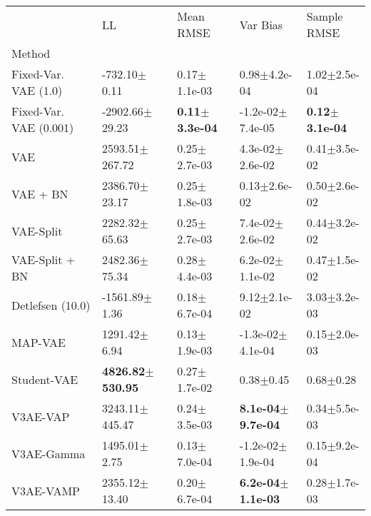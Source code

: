 \begin{tabular}{lllll}
\toprule
{} &                           LL &                  Mean RMSE &                      Var Bias &                Sample RMSE \\
Method                 &                              &                            &                               &                            \\
\midrule
Fixed-Var. VAE (1.0)   &             -732.10$\pm$0.11 &           0.17$\pm$1.1e-03 &              0.98$\pm$4.2e-04 &           1.02$\pm$2.5e-04 \\
Fixed-Var. VAE (0.001) &           -2902.66$\pm$29.23 &  \textbf{0.11$\pm$3.3e-04} &          -1.2e-02$\pm$7.4e-05 &  \textbf{0.12$\pm$3.1e-04} \\
VAE                    &           2593.51$\pm$267.72 &           0.25$\pm$2.7e-03 &           4.3e-02$\pm$2.6e-02 &           0.41$\pm$3.5e-02 \\
VAE + BN               &            2386.70$\pm$23.17 &           0.25$\pm$1.8e-03 &              0.13$\pm$2.6e-02 &           0.50$\pm$2.6e-02 \\
VAE-Split              &            2282.32$\pm$65.63 &           0.25$\pm$2.7e-03 &           7.4e-02$\pm$2.6e-02 &           0.44$\pm$3.2e-02 \\
VAE-Split + BN         &            2482.36$\pm$75.34 &           0.28$\pm$4.4e-03 &           6.2e-02$\pm$1.1e-02 &           0.47$\pm$1.5e-02 \\
Detlefsen (10.0)       &            -1561.89$\pm$1.36 &           0.18$\pm$6.7e-04 &              9.12$\pm$2.1e-02 &           3.03$\pm$3.2e-03 \\
MAP-VAE                &             1291.42$\pm$6.94 &           0.13$\pm$1.9e-03 &          -1.3e-02$\pm$4.1e-04 &           0.15$\pm$2.0e-03 \\
Student-VAE            &  \textbf{4826.82$\pm$530.95} &           0.27$\pm$1.7e-02 &                 0.38$\pm$0.45 &              0.68$\pm$0.28 \\
V3AE-VAP               &           3243.11$\pm$445.47 &           0.24$\pm$3.5e-03 &  \textbf{8.1e-04$\pm$9.7e-04} &           0.34$\pm$5.5e-03 \\
V3AE-Gamma             &             1495.01$\pm$2.75 &           0.13$\pm$7.0e-04 &          -1.2e-02$\pm$1.9e-04 &           0.15$\pm$9.2e-04 \\
V3AE-VAMP              &            2355.12$\pm$13.40 &           0.20$\pm$6.7e-04 &  \textbf{6.2e-04$\pm$1.1e-03} &           0.28$\pm$1.7e-03 \\

\end{tabular}
